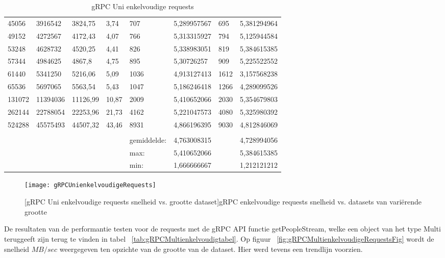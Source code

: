 \begin{table}
\begin{tabular}{llllllll}
        45056 & 3916542 & 3824,75 & 3,74 & 707 & 5,289957567 & 695 & 5,381294964 \\
        49152 & 4272567 & 4172,43 & 4,07 & 766 & 5,313315927 & 794 & 5,125944584 \\
        53248 & 4628732 & 4520,25 & 4,41 & 826 & 5,338983051 & 819 & 5,384615385 \\
        57344 & 4984625 & 4867,8 & 4,75 & 895 & 5,30726257 & 909 & 5,225522552 \\
        61440 & 5341250 & 5216,06 & 5,09 & 1036 & 4,913127413 & 1612 & 3,157568238 \\
        65536 & 5697065 & 5563,54 & 5,43 & 1047 & 5,186246418 & 1266 & 4,289099526 \\
        131072 & 11394036 & 11126,99 & 10,87 & 2009 & 5,410652066 & 2030 & 5,354679803 \\
        262144 & 22788054 & 22253,96 & 21,73 & 4162 & 5,221047573 & 4080 & 5,325980392 \\
        524288 & 45575493 & 44507,32 & 43,46 & 8931 & 4,866196395 & 9030 & 4,812846069 \\
         &  &  &  &  &  &  &  \\
         &  &  &  & gemiddelde: & 4,763008315 &  & 4,728994056 \\
         &  &  &  & max: & 5,410652066 &  & 5,384615385 \\
         &  &  &  & min: & 1,666666667 &  & 1,212121212 \\
        \bottomrule
    \end{tabular}
    \caption{gRPC Uni enkelvoudige requests}
    \label{tab:gRPCUnienkelvoudigtabel}
\end{table}

\begin{figure}[ht]
    \centering
    \texttt{[image: gRPCUnienkelvoudigeRequests]}
    \caption{[gRPC Uni enkelvoudige requests snelheid vs. grootte dataset]gRPC enkelvoudige requests snelheid vs. datasets van vari\"erende grootte}
    \label{fig:gRPCUnienkelvoudigeRequestsFig}
\end{figure}

De resultaten van de performantie testen voor de requests met de gRPC API functie getPeopleStream, welke een object van het type Multi teruggeeft zijn
terug te vinden in tabel ~\ref{tab:gRPCMultienkelvoudigtabel}.
Op figuur ~\ref{fig:gRPCMultienkelvoudigeRequestsFig} wordt de snelheid \(MB/sec\) weergegeven ten opzichte van de grootte van de dataset. Hier werd tevens een trendlijn voorzien.

